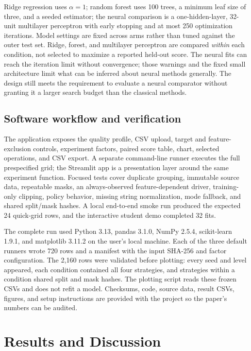 \documentclass[conference]{IEEEtran}
\begin{document}
Ridge regression uses $\alpha=1$; random forest uses 100 trees, a minimum leaf size of three, and a seeded estimator; the neural comparison is a one-hidden-layer, 32-unit multilayer perceptron with early stopping and at most 250 optimization iterations. Model settings are fixed across arms rather than tuned against the outer test set. Ridge, forest, and multilayer perceptron are compared \emph{within} each condition, not selected to maximize a reported held-out score. The neural fits can reach the iteration limit without convergence; those warnings and the fixed small architecture limit what can be inferred about neural methods generally. The design still meets the requirement to evaluate a neural comparator without granting it a larger search budget than the classical methods.

\subsection{Software workflow and verification}
The application exposes the quality profile, CSV upload, target and feature-exclusion controls, experiment factors, paired score table, chart, selected operations, and CSV export. A separate command-line runner executes the full prespecified grid; the Streamlit app is a presentation layer around the same experiment function. Focused tests cover duplicate grouping, immutable source data, repeatable masks, an always-observed feature-dependent driver, training-only clipping, policy behavior, missing string normalization, mode fallback, and shared split/mask hashes. A local end-to-end smoke run produced the expected 24 quick-grid rows, and the interactive student demo completed 32 fits.

The complete run used Python 3.13, pandas 3.1.0, NumPy 2.5.4, scikit-learn 1.9.1, and matplotlib 3.11.2 on the user's local machine. Each of the three default runners wrote 720 rows and a manifest with the input SHA-256 and factor configuration. The 2,160 rows were validated before plotting: every seed and level appeared, each condition contained all four strategies, and strategies within a condition shared split and mask hashes. The plotting script reads these frozen CSVs and does not refit a model. Checksums, code, source data, result CSVs, figures, and setup instructions are provided with the project so the paper's numbers can be audited.

\section{Results and Discussion}
\end{document}
